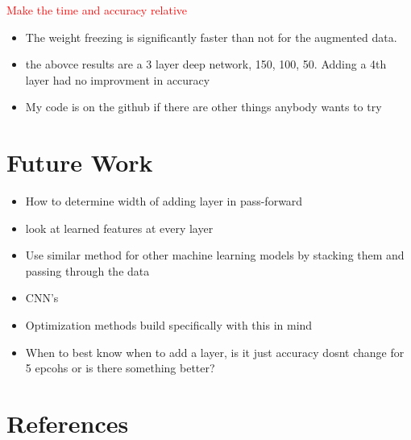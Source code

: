 \documentclass{article}
\newcommand\todo[1]{\textcolor{red}{#1}}
\begin{document}
\todo{Make the time and accuracy relative}

\begin{itemize}
\item The weight freezing is significantly faster than not for the augmented data. 
\item the abovce results are a 3 layer deep network, 150, 100, 50. Adding a 4th layer had no improvment in accuracy
\item My code is on the github if there are other things anybody wants to try
\end{itemize}

\section{Future Work}

\begin{itemize}
\item How to determine width of adding layer in pass-forward
\item look at learned features at every layer
\item Use similar method for other machine learning models by stacking them and passing through the data
\item CNN's
\item Optimization methods build specifically with this in mind
\item When to best know when to add a layer, is it just accuracy dosnt change for 5 epcohs or is there something better?
\end{itemize}

\section*{References}
\end{document}
